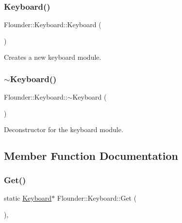 \subsubsection{\texorpdfstring{Keyboard()}{Keyboard()}}
{\footnotesize\ttfamily Flounder\+::\+Keyboard\+::\+Keyboard (\begin{DoxyParamCaption}{ }\end{DoxyParamCaption})}



Creates a new keyboard module. 

\mbox{\label{class_flounder_1_1_keyboard_adede9371069284614e104cf87b262f75}} 
\subsubsection{\texorpdfstring{$\sim$\+Keyboard()}{~Keyboard()}}
{\footnotesize\ttfamily Flounder\+::\+Keyboard\+::$\sim$\+Keyboard (\begin{DoxyParamCaption}{ }\end{DoxyParamCaption})\hspace{0.3cm}{\ttfamily [override]}}



Deconstructor for the keyboard module. 



\subsection{Member Function Documentation}
\mbox{\label{class_flounder_1_1_keyboard_a6a8b43b3a483b15155f1d6d90ceabced}} 
\subsubsection{\texorpdfstring{Get()}{Get()}}
{\footnotesize\ttfamily static \hyperlink{class_flounder_1_1_keyboard}{Keyboard}$\ast$ Flounder\+::\+Keyboard\+::\+Get (\begin{DoxyParamCaption}{ }\end{DoxyParamCaption})\hspace{0.3cm}{\ttfamily [inline]}, {\ttfamily [static]}}



